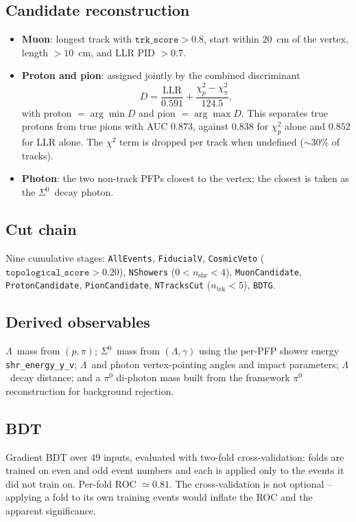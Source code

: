 \documentclass[11pt,a4paper]{article}
\newcommand{\Szero}{\ensuremath{\Sigma^{0}}}
\newcommand{\Lam}{\ensuremath{\Lambda}}
\begin{document}
\subsection{Candidate reconstruction}
\begin{itemize}
  \item \textbf{Muon}: longest track with $\texttt{trk\_score}>0.8$, start within
        $20$~cm of the vertex, length $>10$~cm, and LLR PID $>0.7$.
  \item \textbf{Proton and pion}: assigned jointly by the combined discriminant
        \begin{equation}
          D = \frac{\mathrm{LLR}}{0.591}
              + \frac{\chi^2_p - \chi^2_\pi}{124.5},
          \label{eq:Ddisc}
        \end{equation}
        with proton $=\arg\min D$ and pion $=\arg\max D$. This separates true
        protons from true pions with AUC $0.873$, against $0.838$ for $\chi^2_p$
        alone and $0.852$ for LLR alone. The $\chi^2$ term is dropped per track
        when undefined ($\sim\!30\%$ of tracks).
  \item \textbf{Photon}: the two non-track PFPs closest to the vertex; the closest
        is taken as the \Szero\ decay photon.
\end{itemize}

\subsection{Cut chain}
Nine cumulative stages: \texttt{AllEvents}, \texttt{FiducialV},
\texttt{CosmicVeto} ($\texttt{topological\_score}>0.20$), \texttt{NShowers}
($0<n_{\mathrm{shr}}<4$), \texttt{MuonCandidate}, \texttt{ProtonCandidate},
\texttt{PionCandidate}, \texttt{NTracksCut} ($n_{\mathrm{trk}}<5$), \texttt{BDTG}.

\subsection{Derived observables}
\Lam\ mass from $(p,\pi)$; \Szero\ mass from $(\Lam,\gamma)$ using the per-PFP
shower energy \texttt{shr\_energy\_y\_v}; \Lam\ and photon vertex-pointing angles
and impact parameters; \Lam\ decay distance; and a $\pi^0$ di-photon mass built
from the framework $\pi^0$ reconstruction for background rejection.

\subsection{BDT}
Gradient BDT over 49 inputs, evaluated with two-fold cross-validation: folds are
trained on even and odd event numbers and each is applied only to the events it did
not train on. Per-fold ROC $\simeq0.81$. The cross-validation is not optional --
applying a fold to its own training events would inflate the ROC and the apparent
significance.
\end{document}
